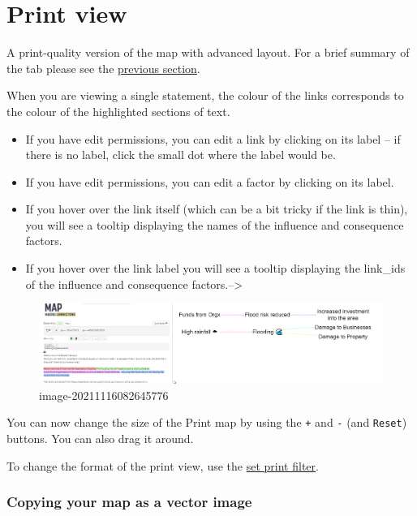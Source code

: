 \documentclass[
]{book}
\begin{document}
\hypertarget{print-view}{%
\chapter{Print view}\label{print-view}}

A print-quality version of the map with advanced layout. For a brief summary of the tab please see the \protect\hyperlink{xinteractive-view}{previous section}.

When you are viewing a single statement, the colour of the links corresponds to the colour of the highlighted sections of text.

\begin{itemize}
\item
  If you have edit permissions, you can edit a link by clicking on its label -- if there is no label, click the small dot where the label would be.
\item
  If you have edit permissions, you can edit a factor by clicking on its label.
\item
  If you hover over the link itself (which can be a bit tricky if the link is thin), you will see a tooltip displaying the names of the influence and consequence factors.
\item
  If you hover over the link label you will see a tooltip displaying the link\_ids of the influence and consequence factors.--\textgreater{}
\end{itemize}

\begin{figure}
\centering
\includegraphics{_assets/image-20211116082645776.png}
\caption{image-20211116082645776}
\end{figure}

You can now change the size of the Print map by using the \texttt{+} and \texttt{-} (and \texttt{Reset}) buttons. You can also drag it around.

To change the format of the print view, use the \protect\hyperlink{xsimple-formats}{set print filter}.

\hypertarget{copy-svg}{%
\subsection{Copying your map as a vector image}\label{copy-svg}}
\end{document}
